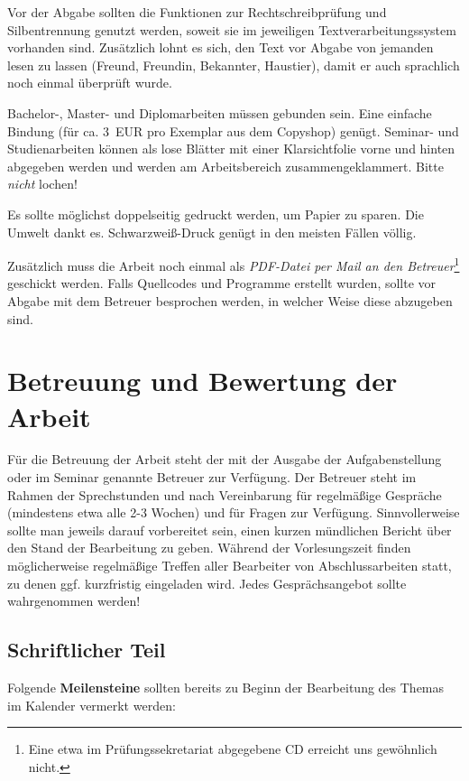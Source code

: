 \documentclass[12pt]{scrartcl}
\begin{document}
Vor der Abgabe sollten die Funktionen zur Rechtschreibprüfung und Silbentrennung genutzt werden, soweit sie im jeweiligen Textverarbeitungssystem vorhanden sind. Zusätzlich lohnt es sich, den Text vor Abgabe von jemanden lesen zu lassen (Freund, Freundin, Bekannter, Haustier), damit er auch sprachlich noch einmal überprüft wurde.

Bachelor-, Master- und Diplomarbeiten müssen gebunden sein. Eine einfache Bindung (für ca. 3~EUR pro Exemplar aus dem Copyshop) genügt. Seminar- und Studienarbeiten können als lose Blätter mit einer Klarsichtfolie vorne und hinten abgegeben werden und werden am Arbeitsbereich zusammengeklammert. Bitte \emph{nicht} lochen!

Es sollte möglichst doppelseitig gedruckt werden, um Papier zu sparen. Die Umwelt dankt es. 
Schwarzweiß-Druck genügt in den meisten Fällen völlig.

Zusätzlich muss die Arbeit noch einmal als \emph{PDF-Datei per Mail an den Betreuer}\footnote{Eine etwa im Prüfungssekretariat abgegebene CD erreicht uns gewöhnlich nicht.} geschickt werden. Falls Quellcodes und Programme erstellt wurden, sollte vor Abgabe mit dem Betreuer besprochen werden, in welcher Weise diese abzugeben sind. 

\section{Betreuung und Bewertung der Arbeit}

Für die Betreuung der Arbeit steht der mit der Ausgabe der Aufgabenstellung oder im Seminar genannte Betreuer zur Verfügung. Der Betreuer steht im Rahmen der Sprechstunden und nach Vereinbarung für regelmäßige Gespräche (mindestens etwa alle 2-3 Wochen) und für Fragen zur Verfügung. Sinnvollerweise sollte man jeweils darauf vorbereitet sein, einen kurzen mündlichen Bericht über den Stand der Bearbeitung zu geben. Während der Vorlesungszeit finden möglicherweise regelmäßige Treffen aller Bearbeiter von Abschlussarbeiten statt, zu denen ggf. kurzfristig eingeladen wird. Jedes Gesprächsangebot sollte wahrgenommen werden!

\subsection{Schriftlicher Teil}

Folgende \textbf{Meilensteine} sollten bereits zu Beginn der Bearbeitung des Themas im Kalender vermerkt werden:
\end{document}

